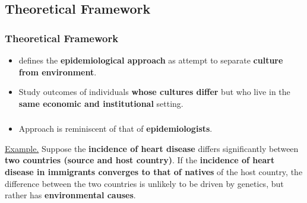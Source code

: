 \documentclass[11pt, aspectratio=1610, xcolor={dvipsnames}]{beamer}
\newcommand{\highlight}[1]{\textbf{\textcolor{PineGreen}{#1}}}
\begin{document}
	\subsection{Theoretical Framework}
	\begin{frame}
		\frametitle{Theoretical Framework}
		
		\begin{itemize}
			\item \cite{Fernandez2011} defines the \highlight{epidemiological approach} as attempt to separate \highlight{culture from environment}.
			\item Study outcomes of individuals \highlight{whose cultures differ} but who live in the \highlight{same economic and institutional} setting.
		\end{itemize}
		
	\end{frame}
	
	\begin{frame}
		\frametitle{}
		
		\begin{itemize}
			\item Approach is reminiscent of that of \highlight{epidemiologists}.
		\end{itemize}
		
		\vspace{8mm}
		
		\begin{minipage}{\linewidth}
			\textcolor{PineGreen}{\underline{Example.}} Suppose the \highlight{incidence of heart disease} differs significantly between \highlight{two countries (source and host country)}. If the \highlight{incidence of heart disease in immigrants converges to that of natives} of the host country, the difference between the two countries is unlikely to be driven by genetics, but rather has \highlight{environmental causes}.
		\end{minipage}
		
	\end{frame}
	
\end{document}
